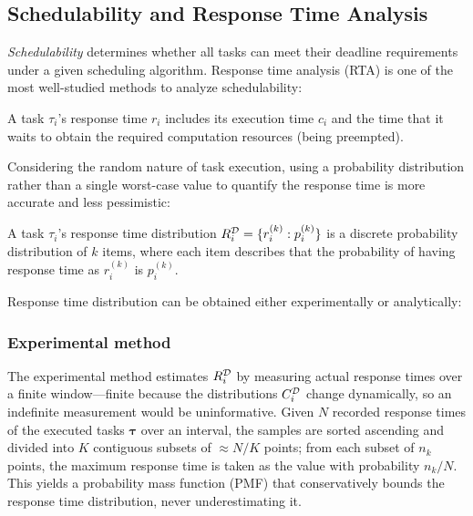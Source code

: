 	\subsection{Schedulability and Response Time Analysis}
	\label{sectino_schedulability_analysis}

    \textit{Schedulability} determines whether all tasks can meet their deadline requirements under a given scheduling algorithm.
	Response time analysis (RTA) is one of the most well-studied methods to analyze schedulability:
	\begin{definition}
		A task $\tau_i$'s response time $r_i$ includes its execution time $c_i$ and the time that it waits to obtain the required computation resources (\eg being preempted).
	\end{definition}

	Considering the random nature of task execution, using a probability distribution rather than a single worst-case value to quantify the response time is more accurate and less pessimistic:
	\begin{definition}
		A task $\tau_i$'s response time distribution $R_{i}^{\mathcal{D}} = \{r_i^{(k)}: p_i^{(k)}\}$ is a discrete probability distribution of $k$ items,
		where each item describes that the probability of having response time as $r_i^{(k)}$ is $p_i^{(k)}$.
	\end{definition}

    Response time distribution can be obtained either experimentally or analytically:

\subsubsection{Experimental method}
    The experimental method estimates $R_{i}^{\mathcal{D}}$ by measuring actual response times over a finite window---finite because the distributions $C_{i}^{\mathcal{D}}$ change dynamically, so an indefinite measurement would be uninformative.
    Given $N$ recorded response times of the executed tasks $\boldsymbol{\tau}$ over an interval, the samples are sorted ascending and divided into $K$ contiguous subsets of $\approx N/K$ points; from each subset of $n_k$ points, the maximum response time is taken as the value with probability $n_k / N$.
    This yields a probability mass function (PMF) that conservatively bounds the response time distribution, never underestimating it.

